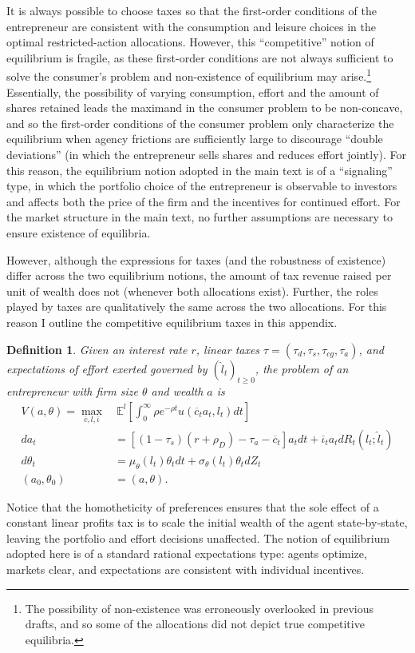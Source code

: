 \documentclass[11pt]{article}
\theoremstyle{plain}
\newtheorem{defn}{Definition}[section]
\begin{document}
It is always possible to choose taxes so that the first-order conditions of the entrepreneur are consistent with the consumption and leisure choices in the optimal restricted-action allocations. However, this ``competitive'' notion of equilibrium is fragile, as these first-order conditions are not always sufficient to solve the consumer's problem and non-existence of equilibrium may arise.\footnote{The possibility of non-existence was erroneously overlooked in previous drafts, and so some of the allocations did not depict true competitive equilibria.} Essentially, the possibility of varying consumption, effort and the amount of shares retained leads the maximand in the consumer problem to be non-concave, and so the first-order conditions of the consumer problem only characterize the equilibrium when agency frictions are sufficiently large to discourage ``double deviations'' (in which the entrepreneur sells shares and reduces effort jointly). For this reason, the equilibrium notion adopted in the main text is of a ``signaling'' type, in which the portfolio choice of the entrepreneur is observable to investors and affects both the price of the firm and the incentives for continued effort. For the market structure in the main text, no further assumptions are necessary to ensure existence of equilibria. 

However, although the expressions for taxes (and the robustness of existence) differ across the two equilibrium notions, the amount of tax revenue raised per unit of wealth does not (whenever both allocations exist). Further, the roles played by taxes are qualitatively the same across the two allocations. For this reason I outline the competitive equilibrium taxes in this appendix. 

\begin{defn} \label{conPROBlin}
Given an interest rate $r$, linear taxes $\tau = (\tau_d,\tau_s,\tau_{cg},\tau_a)$, and expectations of effort exerted governed by $(\hat{l}_t)_{t\geq0}$, the problem of an entrepreneur with firm size $\theta$ and wealth $a$ is
\begin{align*}
V(a,\theta) = \max_{\overline{c},l,\overline{\iota}} & \ \mathbb{E}^l{\left[\int_{0}^{\infty}\rho e^{-\rho t}u(\overline{c}_ta_t,l_t)dt\right]}
\\ da_t & = [(1-\tau_{s})(r + \rho_D) - \tau_a - \overline{c}_t]a_tdt + \overline{\iota}_t a_tdR_t(l_t;\hat{l}_t)
\\ d\theta_t & = \mu_{\theta}(l_t)\theta_t dt + \sigma_{\theta}(l_t) \theta_t dZ_t
\\ (a_0,\theta_0) & = (a,\theta).
\end{align*}
\end{defn}
Notice that the homotheticity of preferences ensures that the sole effect of a constant linear profits tax is to scale the initial wealth of the agent state-by-state, leaving the portfolio and effort decisions unaffected. The notion of equilibrium adopted here is of a standard rational expectations type: agents optimize, markets clear, and expectations are consistent with individual incentives. 
\end{document}
